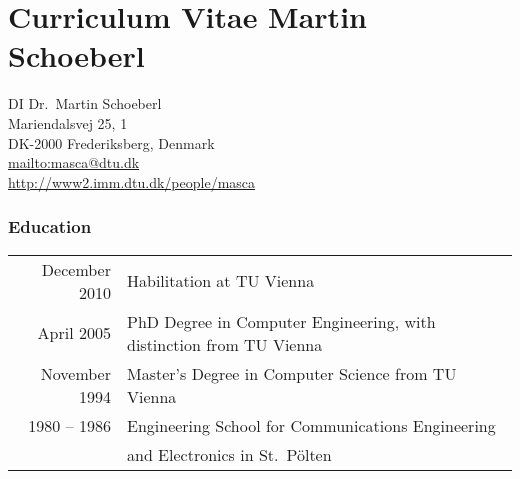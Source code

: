 \documentclass[%
    a4paper,
    12pt, %
    headinclude, footexclude,
    notitlepage,
    headsepline,
    pointlessnumbers,
    ]{scrartcl}
\begin{document}


\section*{Curriculum Vitae Martin Schoeberl}

\noindent DI Dr.~Martin Schoeberl\\
Mariendalsvej 25, 1\\
DK-2000 Frederiksberg, Denmark\\
\url{mailto:masca@dtu.dk}\\
\url{http://www2.imm.dtu.dk/people/masca}


\subsubsection*{Education}

\begin{tabular}{rl}
December 2010 & Habilitation at TU Vienna \\
April 2005   & PhD Degree in Computer Engineering, with distinction from TU Vienna\\
November 1994 & Master's Degree in Computer Science from TU Vienna\\
1980 -- 1986 & Engineering School for Communications Engineering\\
             & and Electronics in St.\ P\"olten\\
\end{tabular}
\end{document}
